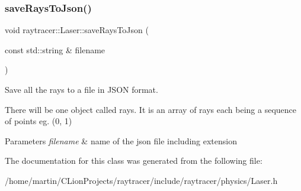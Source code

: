 \subsubsection{\texorpdfstring{save\+Rays\+To\+Json()}{saveRaysToJson()}}
{\footnotesize\ttfamily void raytracer\+::\+Laser\+::save\+Rays\+To\+Json (\begin{DoxyParamCaption}\item[{const std\+::string \&}]{filename }\end{DoxyParamCaption})}



Save all the rays to a file in J\+S\+ON format. 

There will be one object called rays. It is an array of rays each being a sequence of points eg. (0, 1) 
\begin{DoxyParams}{Parameters}
{\em filename} & name of the json file including extension \\
\hline
\end{DoxyParams}


The documentation for this class was generated from the following file\+:\begin{DoxyCompactItemize}
\item 
/home/martin/\+C\+Lion\+Projects/raytracer/include/raytracer/physics/Laser.\+h\end{DoxyCompactItemize}
